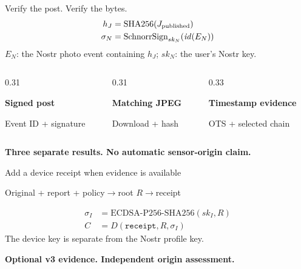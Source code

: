\documentclass[aspectratio=169,t,11pt]{beamer}
\newcommand{\muted}[1]{{\color{kn-muted}#1}}
\newcommand{\labelsmall}[1]{{\scriptsize\color{kn-muted}#1}\par}
\begin{document}
\begin{frame}{Verify the post. Verify the bytes.}
\vspace{0.35cm}
\begin{align*}
h_J &= \mathrm{SHA256}(J_{\rm published})\\
\sigma_N &= \mathrm{SchnorrSign}_{sk_N}(\mathit{id}(E_N))
\end{align*}
\labelsmall{$E_N$: the Nostr photo event containing $h_J$; $sk_N$: the user's Nostr key.}
\vspace{0.35cm}
\begin{columns}[T,onlytextwidth]
\begin{column}{0.31\textwidth}\begin{pitchcard}\textbf{Signed post}\par Event ID + signature\end{pitchcard}\end{column}
\begin{column}{0.31\textwidth}\begin{pitchcard}\textbf{Matching JPEG}\par Download + hash\end{pitchcard}\end{column}
\begin{column}{0.33\textwidth}\begin{pitchcard}\textbf{Timestamp evidence}\par OTS + selected chain\end{pitchcard}\end{column}
\end{columns}
\vfill
\textcolor{kn-acc}{\textbf{Three separate results. No automatic sensor-origin claim.}}
\end{frame}

\begin{frame}{Add a device receipt when evidence is available}
\vspace{0.4cm}
\begin{center}
Original + report + policy\quad$\longrightarrow$\quad root $R$\quad$\longrightarrow$\quad receipt
\end{center}
\vspace{0.2cm}
\begin{align*}
\sigma_I &= \mathrm{ECDSA\text{-}P256\text{-}SHA256}(sk_I,R)\\
C &= D(\texttt{receipt},R,\sigma_I)
\end{align*}
\vspace{0.25cm}
\muted{The device key is separate from the Nostr profile key.}\par
\vfill
\textcolor{kn-acc}{\textbf{Optional v3 evidence. Independent origin assessment.}}
\end{frame}
\end{document}
